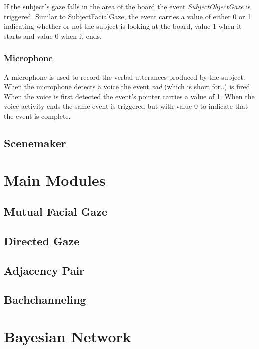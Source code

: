 \documentclass[12pt, a4paper, fleqn]{memoir}%
\begin{document}
If the subject's gaze falls in the area of the board the event \textit{SubjectObjectGaze} is triggered. Similar to SubjectFacialGaze, the event carries a value of either 0 or 1 indicating whether or not the subject is looking at the board, value 1 when it starts and value 0 when it ends.

\subsection{Microphone}
A microphone is used to record the verbal utterances produced by the subject. When the microphone detects a voice the event \textit{vad} (which is short for..) is fired. When the voice is first detected the event's pointer carries a value of 1. When the voice activity ends the same event is triggered but with value 0 to indicate that the event is complete.

\section{Scenemaker}
\label{sec:Scenemaker}

\chapter{Main Modules}
\label{chap:MainModules}

\section{Mutual Facial Gaze}
\label{sec:MutualFacialGaze}

\section{Directed Gaze}
\label{sec:DirectedGaze}

\section{Adjacency Pair}
\label{sec:AdjacencyPair}

\section{Bachchanneling}
\label{sec:Bachchanneling}

\chapter{Bayesian Network}
\label{chap:BayesianNetwork}
\end{document}
